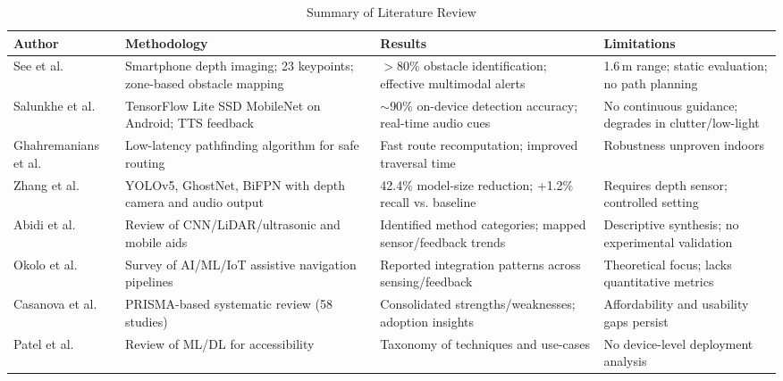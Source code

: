 \documentclass{FastFyp}
\begin{document}
\begin{table}[h!]
\centering
\caption{Summary of Literature Review}
\begin{tabular}{|p{3cm}|p{4cm}|p{4cm}|p{3cm}|}
\hline
\textbf{Author} & \textbf{Methodology} & \textbf{Results} & \textbf{Limitations} \\ \hline

See et al. \cite{ref:see2022smartphone} & Smartphone depth imaging; 23 keypoints; zone-based obstacle mapping & $>$80\% obstacle identification; effective multimodal alerts & 1.6\,m range; static evaluation; no path planning \\ \hline

Salunkhe et al. \cite{ref:salunkhe2021android} & TensorFlow Lite SSD MobileNet on Android; TTS feedback & $\sim$90\% on-device detection accuracy; real-time audio cues & No continuous guidance; degrades in clutter/low-light \\ \hline

Ghahremanians et al. \cite{ref:ghahremanians2025efficient} & Low-latency pathfinding algorithm for safe routing & Fast route recomputation; improved traversal time &  Robustness unproven indoors \\ \hline

Zhang et al. \cite{ref:zhang2024improved} & YOLOv5, GhostNet, BiFPN with depth camera and audio output & 42.4\% model-size reduction; +1.2\% recall vs. baseline & Requires depth sensor; controlled setting \\ \hline

Abidi et al. \cite{ref:abidi2024comprehensive} & Review of CNN/LiDAR/ultrasonic and mobile aids & Identified method categories; mapped sensor/feedback trends & Descriptive synthesis; no experimental validation \\ \hline

Okolo et al. \cite{ref:okolo2024assistive} & Survey of AI/ML/IoT assistive navigation pipelines & Reported integration patterns across sensing/feedback & Theoretical focus; lacks quantitative metrics \\ \hline

Casanova et al. \cite{ref:casanova2025technological} & PRISMA-based systematic review (58 studies) & Consolidated strengths/weaknesses; adoption insights & Affordability and usability gaps persist \\ \hline

Patel et al. \cite{ref:patel2025enhancing} & Review of ML/DL for accessibility  & Taxonomy of techniques and use-cases & No device-level deployment analysis \\ \hline


\end{tabular}
\end{table}
\end{document}
